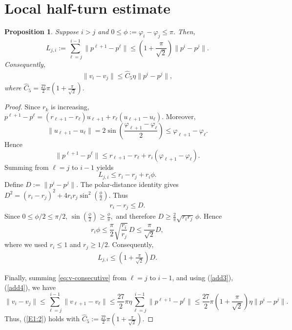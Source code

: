 \documentclass[11pt]{article}
\numberwithin{equation}{section}
\newtheorem{proposition}[theorem]{Proposition}
\begin{document}
\section{Local half-turn  estimate}\label{app:local-whitney}

\begin{proposition}\label{prop:local-half-turn}
Suppose $i>j$ and
$
0\le \phi:=\varphi_i-\varphi_j\le\pi.
$
Then,
$$
L_{j,i}:=
\sum_{\ell=j}^{i-1}\|p^{\ell+1}-p^\ell\|
\le
\left(1+\frac{\pi}{\sqrt2}\right)\|p^i-p^j\|.
$$
Consequently,
\begin{eqnarray}\label{E1:2}
\|v_i-v_j\|
\le
\widehat C_5\eta\|p^i-p^j\|,
\end{eqnarray}
where $\widehat C_5=\frac{27}{2}\pi\left(1+\frac{\pi}{\sqrt{2}}\right)$.
\end{proposition}

\begin{proof}
Since $r_k$ is increasing,
$
p^{\ell+1}-p^\ell
=
(r_{\ell+1}-r_\ell)u_{\ell+1}
+
r_\ell(u_{\ell+1}-u_\ell).
$
Moreover,
$$
\|u_{\ell+1}-u_\ell\|
=
2\sin\!\left(\frac{\varphi_{\ell+1}-\varphi_\ell}{2}\right)
\le
\varphi_{\ell+1}-\varphi_\ell.
$$
Hence
\[
\|p^{\ell+1}-p^\ell\|
\le
r_{\ell+1}-r_\ell
+
r_i(\varphi_{\ell+1}-\varphi_\ell).
\]
Summing from $\ell=j$ to $i-1$ yields
\[
L_{j,i}
\le
r_i-r_j+r_i\phi.
\]
Define
$
D:=\|p^i-p^j\|.
$
The polar-distance identity gives
$
D^2
=
(r_i-r_j)^2
+
4r_ir_j\sin^2\!\left(\frac{\phi}{2}\right).
$
Thus \begin{eqnarray}\label{add3}r_i-r_j\le D.\end{eqnarray}
 Since
$0\le\phi/2\le\pi/2$,
$
\sin\!\left(\frac{\phi}{2}\right)\ge\frac{\phi}{\pi},
$
and therefore
$
D
\ge
\frac{2}{\pi}\sqrt{r_ir_j}\,\phi.
$
Hence
\[
r_i\phi
\le
\frac{\pi}{2}
\sqrt{\frac{r_i}{r_j}}\,D
\le
\frac{\pi}{\sqrt2}D,
\]
where we used $r_i\le1$ and $r_j\ge1/2$. Consequently,
\begin{eqnarray}\label{add4}
L_{j,i}
\le
\left(1+\frac{\pi}{\sqrt2}\right)D.
\end{eqnarray}

\noindent Finally, summing \eqref{eq:v-consecutive} from $\ell=j$ to $i-1$, and using (\ref{add3}), (\ref{add4}), we have
\[
\|v_i-v_j\|
\le
\sum_{\ell=j}^{i-1}\|v_{\ell+1}-v_\ell\|
\le
\frac{27}{2}\pi\eta
\sum_{\ell=j}^{i-1}\|p^{\ell+1}-p^\ell\|
\le
\frac{27}{2}\pi(1+\frac{\pi}{\sqrt{2}})\eta\|p^i-p^j\|.
\]
Thus, (\ref{E1:2}) holds with $\widehat C_5:=\frac{27}{2}\pi(1+\frac{\pi}{\sqrt{2}})$.
\end{proof}
\end{document}
